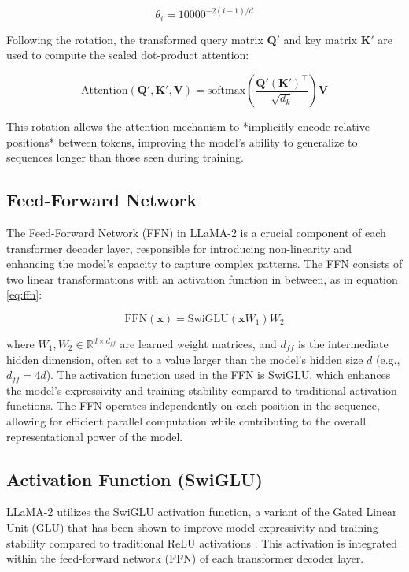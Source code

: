 \begin{equation}
\theta_i = 10000^{-2(i-1)/d}
\end{equation}

Following the rotation, the transformed query matrix $\mathbf{Q}'$ and key matrix $\mathbf{K}'$ are used to compute the scaled dot-product attention:

\begin{equation}
\text{Attention}(\mathbf{Q}', \mathbf{K}', \mathbf{V}) = \text{softmax}\left(\frac{\mathbf{Q}' (\mathbf{K}')^\top}{\sqrt{d_k}}\right) \mathbf{V}
\end{equation}

This rotation allows the attention mechanism to *implicitly encode relative positions* between tokens, improving the model's ability to generalize to sequences longer than those seen during training.

\subsection{Feed-Forward Network}
The Feed-Forward Network (FFN) in LLaMA-2 is a crucial component of each transformer decoder layer, responsible for introducing non-linearity and enhancing the model's capacity to capture complex patterns. The FFN consists of two linear transformations with an activation function in between, as in equation \eqref{eq:ffn}:

\begin{equation}
    \label{eq:ffn}
\text{FFN}(\mathbf{x}) = \text{SwiGLU}(\mathbf{x} W_1) W_2
\end{equation}

where $W_1, W_2 \in \mathbb{R}^{d \times d_{ff}}$ are learned weight matrices, and $d_{ff}$ is the intermediate hidden dimension, often set to a value larger than the model's hidden size $d$ (e.g., $d_{ff} = 4d$). The activation function used in the FFN is SwiGLU, which enhances the model's expressivity and training stability compared to traditional activation functions. The FFN operates independently on each position in the sequence, allowing for efficient parallel computation while contributing to the overall representational power of the model.


\subsection{Activation Function (SwiGLU)}
LLaMA-2 utilizes the SwiGLU activation function, a variant of the Gated Linear Unit (GLU) that has been shown to improve model expressivity and training stability compared to traditional ReLU activations \cite{shazeer2020glu}. This activation is integrated within the feed-forward network (FFN) of each transformer decoder layer.

